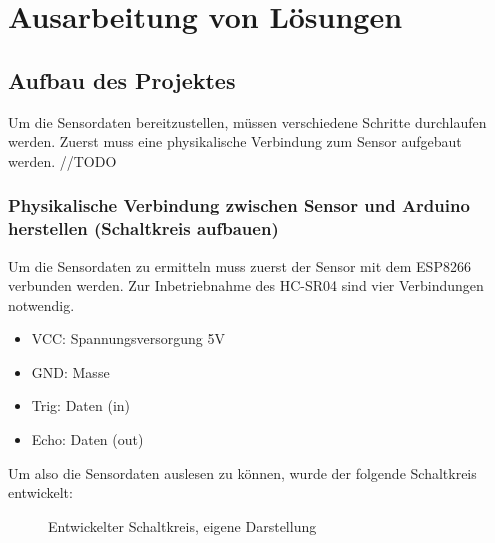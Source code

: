 
\chapter{Ausarbeitung von Lösungen}
\section{Aufbau des Projektes}
Um die Sensordaten bereitzustellen, müssen verschiedene Schritte durchlaufen werden. Zuerst muss eine physikalische Verbindung zum Sensor aufgebaut werden. //TODO

\subsection{Physikalische Verbindung zwischen Sensor und Arduino herstellen (Schaltkreis aufbauen)}
Um die Sensordaten zu ermitteln muss zuerst der Sensor mit dem ESP8266 verbunden werden. Zur Inbetriebnahme des HC-SR04 sind vier Verbindungen notwendig.
\begin{itemize}
    \item VCC: Spannungsversorgung 5V
    \item GND: Masse
    \item Trig: Daten (in)
    \item Echo: Daten (out)
\end{itemize}
Um also die Sensordaten auslesen zu können, wurde der folgende Schaltkreis entwickelt:
\begin{figure}[h!]
	\centering
	\caption[Entwickelter Schaltkreis]{Entwickelter Schaltkreis, eigene Darstellung \protect{}}\label{fig:withSource} %
\end{figure}
